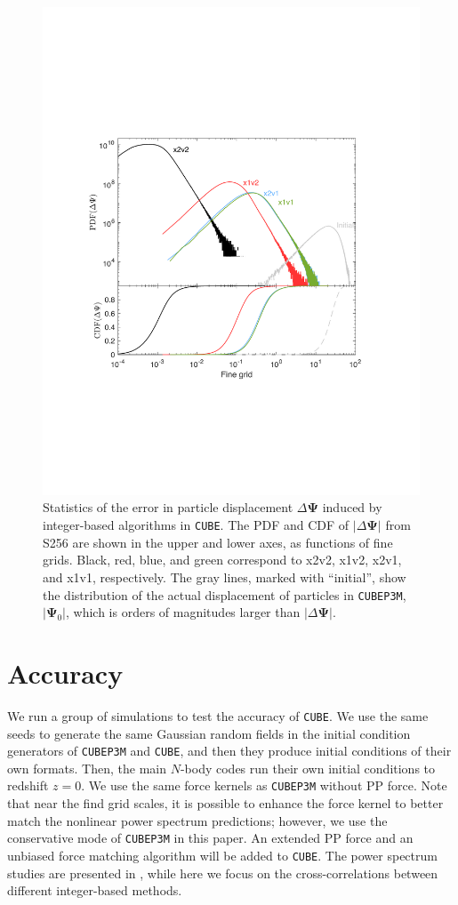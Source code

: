 \documentclass[10pt,twocolumn,preprint]{emulateapj}
\newcommand{\bs}{\boldsymbol}
\begin{document}
\begin{figure}[]
\centering
  \includegraphics[width=0.99\linewidth]{f8}
 \caption{Statistics of the error in particle displacement $\Delta{\bs\Psi}$ induced by integer-based algorithms in {\tt CUBE}. The PDF and CDF of $|\Delta{\bs\Psi}|$ from S256 are shown in the upper and lower axes, as functions of fine grids. Black, red, blue, and green correspond to x2v2, x1v2, x2v1, and x1v1, respectively. The gray lines, marked with ``initial'', show the distribution of the actual displacement of particles in {\tt CUBEP3M}, $|{\bs\Psi}_0|$, which is orders of magnitudes larger than $|\Delta{\bs\Psi}|$. }
\label{fig.dsp}
\end{figure}

\section{Accuracy}\label{s.results}
We run a group of simulations to test the accuracy of {\tt CUBE}. We use the same seeds to generate the same Gaussian random fields in the initial condition generators of {\tt CUBEP3M} and {\tt CUBE}, and then they produce initial conditions of their own formats. Then, the main $N$-body codes run their own initial conditions to redshift $z=0$. We use the same force kernels as {\tt CUBEP3M} without PP force. Note that near the find grid scales, it is possible to enhance the force kernel to better match the nonlinear power spectrum predictions; however, we use the conservative mode of {\tt CUBEP3M} in this paper. An extended PP force and an unbiased force matching algorithm will be added to {\tt CUBE}. The power spectrum studies are presented in \citet{2013MNRAS.436..540H}, while here we focus on the cross-correlations between different integer-based methods.
\end{document}
